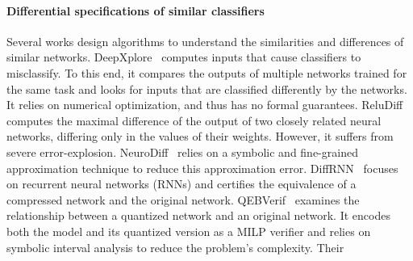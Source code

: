      
\paragraph{Differential specifications of similar classifiers}
Several works design algorithms to understand the similarities and differences of similar networks.
DeepXplore~\cite{DEEPXPLORE} computes inputs that cause classifiers to misclassify. 
To this end, it compares the outputs of multiple networks trained for the same task and looks for inputs that are classified differently by the networks. It relies on numerical optimization, and thus has no formal guarantees. %
ReluDiff~\cite{RELUDIFF} computes the maximal difference of the output of two closely related neural networks, differing only in the values of their weights. However, it suffers from severe error-explosion. NeuroDiff~\cite{NEURODIFF} relies on a symbolic and fine-grained approximation technique to reduce this approximation error. DiffRNN~\cite{DIFFRNN} focuses on recurrent neural networks (RNNs) and certifies the equivalence of a compressed network and the original network. QEBVerif~\cite{QEBVERIF} examines the relationship between a quantized network and an original network. It encodes both the model and its quantized version as a MILP verifier and relies on symbolic interval analysis to reduce the problem's complexity. Their %
